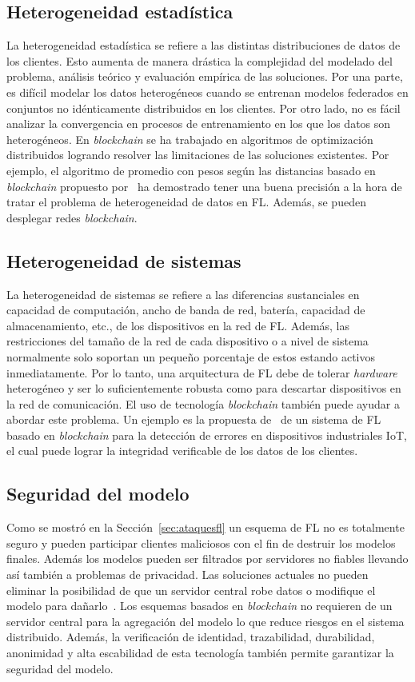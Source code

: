 \subsection{Heterogeneidad estadística}

La heterogeneidad estadística se refiere a las distintas distribuciones de datos de los clientes. Esto aumenta de manera drástica la complejidad del modelado del problema, análisis teórico y evaluación empírica de las soluciones. Por una parte, es difícil modelar los datos heterogéneos cuando se entrenan modelos federados en conjuntos no idénticamente distribuidos en los clientes. Por otro lado, no es fácil analizar la convergencia en procesos de entrenamiento en los que los datos son heterogéneos. En \textit{blockchain} se ha trabajado en algoritmos de optimización distribuidos logrando resolver las limitaciones de las soluciones existentes. Por ejemplo, el algoritmo de promedio con pesos según las distancias basado en \textit{blockchain} propuesto por~\citet{zhang-2021} ha demostrado tener una buena precisión a la hora de tratar el problema de heterogeneidad de datos en \ac{FL}. Además, se pueden desplegar redes \textit{blockchain}.

\subsection{Heterogeneidad de sistemas}
La heterogeneidad de sistemas se refiere a las diferencias sustanciales en capacidad de computación, ancho de banda de red, batería, capacidad de almacenamiento, etc., de los dispositivos en la red de \ac{FL}. Además, las restricciones del tamaño de la red de cada dispositivo o a nivel de sistema normalmente solo soportan un pequeño porcentaje de estos estando activos inmediatamente. Por lo tanto, una arquitectura de \ac{FL} debe de tolerar \textit{hardware} heterogéneo y ser lo suficientemente robusta como para descartar dispositivos en la red de comunicación. El uso de tecnología \textit{blockchain} también puede ayudar a abordar este problema. Un ejemplo es la propuesta de~\citet{zhang-2021} de un sistema de \ac{FL} basado en \textit{blockchain} para la detección de errores en dispositivos industriales \ac{IoT}, el cual puede lograr la integridad verificable de los datos de los clientes.

\subsection{Seguridad del modelo}
Como se mostró en la Sección~\ref{sec:ataquesfl} un esquema de \ac{FL} no es totalmente seguro y pueden participar clientes maliciosos con el fin de destruir los modelos finales. Además los modelos pueden ser filtrados por servidores no fiables llevando así también a problemas de privacidad. Las soluciones actuales no pueden eliminar la posibilidad de que un servidor central robe datos o modifique el modelo para dañarlo~\cite{zhu-2023-blockfed}. Los esquemas basados en \textit{blockchain} no requieren de un servidor central para la agregación del modelo lo que reduce riesgos en el sistema distribuido. Además, la verificación de identidad, trazabilidad, durabilidad, anonimidad y alta escabilidad de esta tecnología también permite garantizar la seguridad del modelo.

